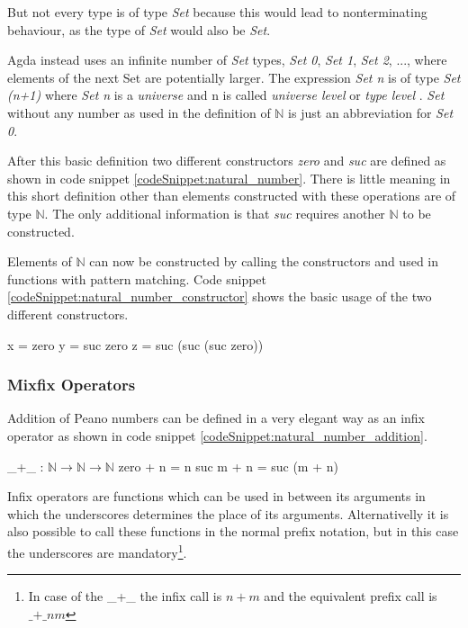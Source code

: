 But not every type is of type \emph{Set} because this would lead to nonterminating behaviour, as the type of \emph{Set} would also be \emph{Set}.

Agda instead uses an infinite number of \emph{Set} types, \emph{Set 0}, \emph{Set 1}, \emph{Set 2}, ..., where elements of the next Set are potentially larger.
The expression \emph{Set n} is of type \emph{Set (n+1)} where \emph{Set n} is a \emph{universe} and n is called \emph{universe level} or \emph{type level} \cite{AgdaReadTheDocs, 10.1145/2841316}.
\emph{Set} without any number as used in the definition of $\mathbb{N}$ is just an abbreviation for \emph{Set 0}.

After this basic definition two different constructors \emph{zero} and \emph{suc} are defined as shown in code snippet \ref{codeSnippet:natural_number}.
There is little meaning in this short definition other than elements constructed with these operations are of type $\mathbb{N}$.
The only additional information is that \emph{suc} requires another $\mathbb{N}$ to be constructed.

Elements of $\mathbb{N}$ can now be constructed by calling the constructors and used in functions with pattern matching. 
Code snippet \ref{codeSnippet:natural_number_constructor} shows the basic usage of the two different constructors.

\begin{codesnippet}[mathescape=true, caption={Some peano numbers}, label={codeSnippet:natural_number_constructor}]
x = zero
y = suc zero
z = suc (suc (suc zero))
\end{codesnippet}

\subsubsection{Mixfix Operators}
Addition of Peano numbers can be defined in a very elegant way as an infix operator as shown in code snippet \ref{codeSnippet:natural_number_addition}.

\begin{codesnippet}[mathescape=true, caption={Peano numbers addition}, label={codeSnippet:natural_number_addition}]
_+_ : $\mathbb{N} \rightarrow \mathbb{N} \rightarrow \mathbb{N}$
zero  + n = n
suc m + n = suc (m + n)
\end{codesnippet}

Infix operators are functions which can be used in between its arguments in which the underscores determines the place of its arguments.
Alternativelly it is also possible to call these functions in the normal prefix notation, but in this case the underscores are mandatory\footnote{In case of the \_+\_ the infix call is $n + m$ and the equivalent prefix call is $\text{\_+\_} n m$}.

